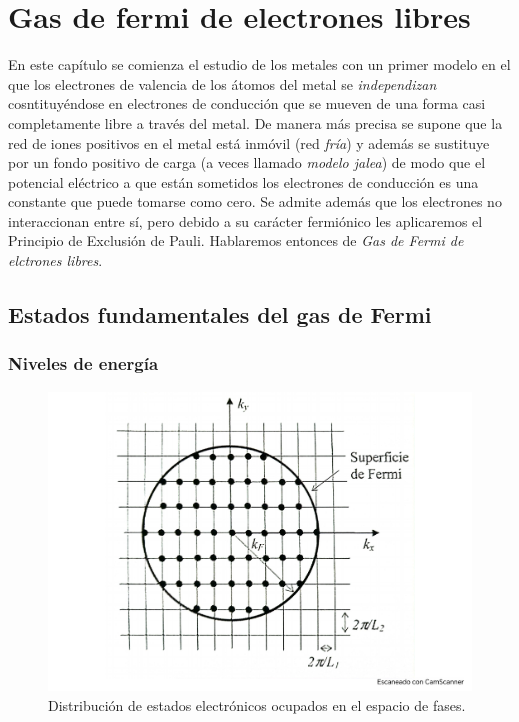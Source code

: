 \chapter{Gas de fermi de electrones libres} \label{Ch:06}

En este capítulo se comienza el estudio de los metales con un primer modelo en el que los electrones de valencia de los átomos del metal se \textit{independizan} cosntituyéndose en electrones de conducción que se mueven de una forma casi completamente libre a través del metal. De manera más precisa se supone que la red de iones positivos en el metal está inmóvil (red \textit{fría}) y además se sustituye por un fondo positivo de carga (a veces llamado \textit{modelo jalea}) de modo que el potencial eléctrico a que están sometidos los electrones de conducción es una constante que puede tomarse como cero. Se admite además que los electrones no interaccionan entre sí, pero debido a su carácter fermiónico les aplicaremos el Principio de Exclusión de Pauli. Hablaremos entonces de \textit{Gas de Fermi de elctrones libres}.

\section{Estados fundamentales del gas de Fermi}

\subsection{Niveles de energía}


\begin{figure}[h!] \centering
    \includegraphics[scale=0.5]{Cuerpo/Ch_06/Fotos libro 1.pdf}
    \caption{Distribución de estados electrónicos ocupados en el espacio de fases.}
    \label{Fig:06-01}
\end{figure}    


